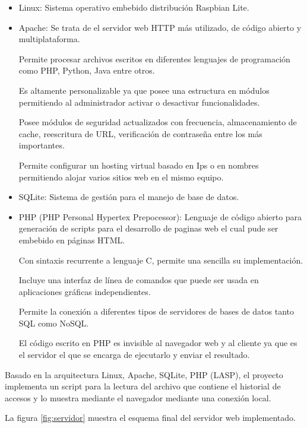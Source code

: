 \begin{itemize}

\item Linux: Sistema operativo embebido distribución Raspbian Lite.

\item Apache: Se trata de el servidor web HTTP más utilizado, de código abierto y multiplataforma.

Permite procesar archivos escritos en diferentes lenguajes de programación como PHP, Python, Java entre otros.

Es altamente personalizable ya que posee una estructura en módulos permitiendo al administrador 	activar o desactivar funcionalidades.

Posee módulos de seguridad actualizados con frecuencia, almacenamiento de cache, reescritura de URL, verificación de contraseña entre los más importantes.

Permite configurar un hosting virtual basado en Ips o en nombres permitiendo alojar varios sitios web en el mismo equipo.

\item SQLite: Sistema de gestión para el manejo de base de datos.

\item PHP (PHP Personal Hypertex Prepocessor): Lenguaje de código abierto para generación de scripts para el desarrollo de paginas web el cual pude ser embebido en páginas HTML.

Con sintaxis recurrente a lenguaje C, permite una sencilla su implementación. 

Incluye una interfaz de línea de comandos que puede ser usada en aplicaciones gráficas independientes.

Permite la conexión a diferentes tipos de servidores de bases de datos tanto SQL como NoSQL.

El código escrito en PHP es invisible al navegador web y al cliente ya que es el servidor el que se encarga de ejecutarlo y enviar el resultado.

\end{itemize}

Basado en la arquitectura Linux, Apache, SQLite, PHP (LASP), el proyecto implementa un script para la lectura del archivo que contiene el historial de accesos y lo muestra mediante el navegador mediante una conexión local.

La figura \ref{fig:servidor} muestra el esquema final del servidor web implementado.

